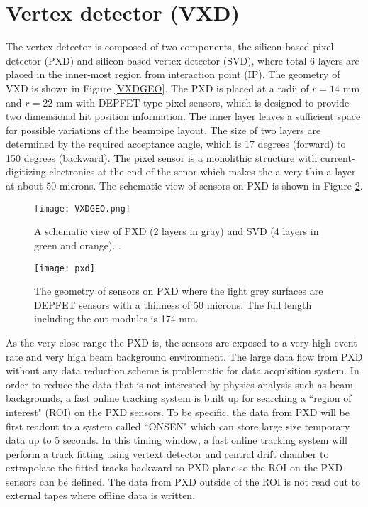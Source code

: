 \section{Vertex detector (VXD)}
The vertex detector is composed of two components, the silicon based pixel detector (PXD) and silicon based vertex detector (SVD), where total 6 layers are placed in the inner-most region from interaction point (IP).  The geometry of VXD is shown in Figure \ref{VXDGEO}. The PXD is placed at a radii of $r=14$ mm and $r=22$ mm with DEPFET\cite{Abe:2010gxa} type pixel sensors, which is designed to provide two dimensional hit position information. The inner layer leaves a sufficient space for possible variations of the beampipe layout. The size of two layers are determined by the required acceptance angle, which is 17 degrees (forward) to 150 degrees (backward). The pixel sensor is a monolithic structure with current-digitizing electronics at the end of the senor which makes the a very thin a layer at about 50 microns. The schematic view of sensors on PXD is shown in Figure \ref{fig:pxd}.
\begin{figure}[htpb]
	\centering
	\texttt{[image: VXDGEO.png]}
	\caption{A schematic view of PXD (2 layers in gray) and SVD (4 layers in green and orange). \cite{Abe:2010gxa}.}
	\label{fig:svdgeo}
\end{figure}
\begin{figure}[htpb]
\centering
\texttt{[image: pxd]}
\caption{The geometry of sensors on PXD where the light grey surfaces are DEPFET sensors with a thinness of 50 microns. The full length including the out modules is 174 mm\cite{Abe:2010gxa}. }
\label{fig:pxd}
\end{figure}
 As the very close range the PXD is, the sensors are exposed to a very high event rate and very high beam background environment. The large data flow from PXD without any data reduction scheme is problematic for data acquisition system. In order to reduce the data that is not interested by physics analysis such as beam backgrounds, a fast online tracking system is built up for searching a ``region of interest" (ROI) on the PXD sensors. To be specific, the data from PXD will be first readout to a system called ``ONSEN" which can store large size temporary data up to 5 seconds. In this timing window, a fast online tracking system will perform a track fitting using vertext detector and central drift chamber to extrapolate the fitted tracks backward to PXD plane so the ROI on the PXD sensors can be defined. The data from PXD outside of the ROI is not read out to external tapes where offline data is written. 

